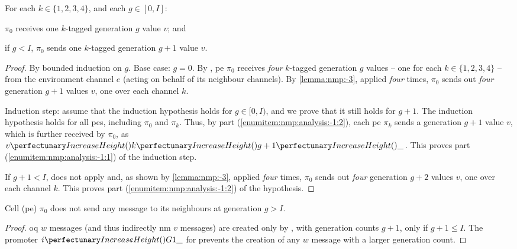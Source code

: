\begin{theorem}\label{theorem:nmp:-1}
    For each $k \in \{ 1, 2, 3, 4 \}$, and each $g \in [0, I]$:
    \begin{inparaenum}[(i)]
        \item\label{enumitem:nmp:analysis:-1:1} $\pi_0$ receives one $k$-tagged generation $g$ value $v$; and
        \item\label{enumitem:nmp:analysis:-1:2} if $g < I$, $\pi_0$ sends one $k$-tagged generation $g+1$ value $v$.
    \end{inparaenum}
\end{theorem}

\begin{proof}
By bounded induction on $g$. Base case: $g = 0$. By , \gls{pe} $\pi_0$ receives \emph{four} $k$-tagged generation $g$ values -- one for each $k \in \{ 1, 2, 3, 4 \}$ -- from the environment channel $e$ (acting on behalf of its neighbour channels). By \cref{lemma:nmp:-3}, applied \emph{four} times, $\pi_0$ sends out \emph{four} generation $g+1$ values $v$, one over each channel $k$.

Induction step: assume that the induction hypothesis holds for 
$g \in [0, I)$, and we prove that it still holds for $g+1$.
The induction hypothesis holds for all \glspl{pe}, 
including $\pi_0$ and $\pi_k$. 
Thus, by part (\ref{enumitem:nmp:analysis:-1:2}), each \gls{pe} $\pi_k$ sends a generation $g+1$ value $v$, 
which is further received by $\pi_0$, as $\cpvv{k}{g+1}{\cpdiscard}$.
This proves part (\ref{enumitem:nmp:analysis:-1:1}) of the induction step.

If $g+1 < I$,  does not apply and, 
as shown by \cref{lemma:nmp:-3}, applied \emph{four} times, 
$\pi_0$ sends out \emph{four} generation $g+2$ values $v$, one over each channel $k$.
This proves part (\ref{enumitem:nmp:analysis:-1:2}) of the hypothesis.
\end{proof}

\begin{theorem}\label{theorem:nmp:-2}
    Cell (\gls{pe}) \(\pi_0\) does not send any message to its neighbours at generation \(g > I\).
\end{theorem}

\begin{proof}
    \Gls{oq} \(w\) messages (and thus indirectly \gls{nm} \(v\) messages) are created only by , with generation counts \(g + 1\), only if \(g + 1 \leq I\).  The promoter \(\cpfunc{i}{G1\cpdiscard}\) for  prevents the creation of any \(w\) message with a larger generation count.
\end{proof}

